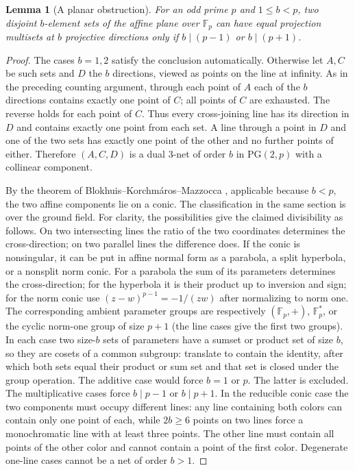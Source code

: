 \documentclass[11pt]{article}
\newtheorem{lemma}[theorem]{Lemma}
\theoremstyle{remark}\newtheorem{remark}[theorem]{Remark}
\newcommand{\F}{\mathbb F}
\begin{document}
\begin{lemma}[A planar obstruction]\label{lem:net}
For an odd prime $p$ and $1\le b<p$, two disjoint $b$-element sets of the affine plane over $\F_p$ can have equal projection multisets at $b$ projective directions only if $b\mid(p-1)$ or $b\mid(p+1)$.
\end{lemma}
\begin{proof}
The cases $b=1,2$ satisfy the conclusion automatically. Otherwise let $A,C$ be such sets and $D$ the $b$ directions, viewed as points on the line at infinity. As in the preceding counting argument, through each point of $A$ each of the $b$ directions contains exactly one point of $C$; all points of $C$ are exhausted. The reverse holds for each point of $C$. Thus every cross-joining line has its direction in $D$ and contains exactly one point from each set. A line through a point in $D$ and one of the two sets has exactly one point of the other and no further points of either. Therefore $(A,C,D)$ is a dual $3$-net of order $b$ in $\mathrm{PG}(2,p)$ with a collinear component.

By the theorem of Blokhuis--Korchm\'aros--Mazzocca \cite[Theorem 5.1]{BKM}, applicable because $b<p$, the two affine components lie on a conic. The classification in the same section is over the ground field. For clarity, the possibilities give the claimed divisibility as follows. On two intersecting lines the ratio of the two coordinates determines the cross-direction; on two parallel lines the difference does. If the conic is nonsingular, it can be put in affine normal form as a parabola, a split hyperbola, or a nonsplit norm conic. For a parabola the sum of its parameters determines the cross-direction; for the hyperbola it is their product up to inversion and sign; for the norm conic use $(z-w)^{p-1}=-1/(zw)$ after normalizing to norm one. The corresponding ambient parameter groups are respectively $(\F_p,+)$, $\F_p^*$, or the cyclic norm-one group of size $p+1$ (the line cases give the first two groups). In each case two size-$b$ sets of parameters have a sumset or product set of size $b$, so they are cosets of a common subgroup: translate to contain the identity, after which both sets equal their product or sum set and that set is closed under the group operation. The additive case would force $b=1$ or $p$. The latter is excluded. The multiplicative cases force $b\mid p-1$ or $b\mid p+1$. In the reducible conic case the two components must occupy different lines: any line containing both colors can contain only one point of each, while $2b\ge6$ points on two lines force a monochromatic line with at least three points. The other line must contain all points of the other color and cannot contain a point of the first color. Degenerate one-line cases cannot be a net of order $b>1$.
\end{proof}
\end{document}
